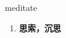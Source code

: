 
\begin{frame}
{\huge meditate}
\begin{center}
\begin{enumerate}\Large
  \item \textbf{思索，沉思}
\end{enumerate}
\end{center}
\end{frame}
